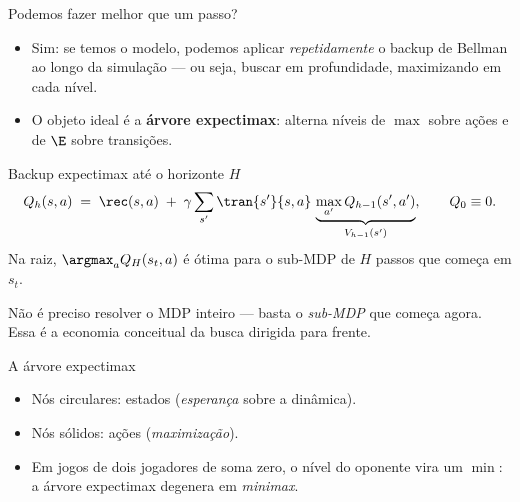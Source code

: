 \documentclass[aspectratio=169, 11pt]{beamer}
\begin{document}
\begin{frame}{Podemos fazer melhor que um passo?}
  \begin{itemize}
    \item Sim: se temos o modelo, podemos aplicar \emph{repetidamente} o backup
          de Bellman ao longo da simulação --- ou seja, buscar em profundidade,
          maximizando em cada nível.
    \item O objeto ideal é a \textbf{árvore expectimax}: alterna níveis de
          $\max$ sobre ações e de $\E$ sobre transições.
  \end{itemize}

  \pause
  \begin{teobox}{Backup expectimax até o horizonte $H$}
    \[
      Q_h(s,a) \;=\; \rec(s,a) \;+\; \gamma \sum_{s'} \tran{s'}{s,a}\,
      \underbrace{\max_{a'} Q_{h-1}(s',a')}_{V_{h-1}(s')},
      \qquad Q_0 \equiv 0 .
    \]
    Na raiz, $\argmax_a Q_H(s_t,a)$ é ótima para o sub-MDP de $H$ passos que
    começa em $s_t$.
  \end{teobox}

  \pause
  Não é preciso resolver o MDP inteiro --- basta o \emph{sub-MDP} que começa agora.
  Essa é a economia conceitual da busca dirigida para frente.
\end{frame}

\begin{frame}{A árvore expectimax}
  \centering

  \vfill
  \begin{itemize}
    \item Nós circulares: estados (\emph{esperança} sobre a dinâmica).
    \item Nós sólidos: ações (\emph{maximização}).
    \item Em jogos de dois jogadores de soma zero, o nível do oponente vira
          um $\min$: a árvore expectimax degenera em \emph{minimax}.
  \end{itemize}
\end{frame}
\end{document}
